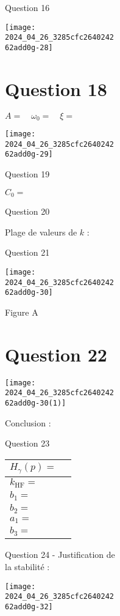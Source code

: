 {\begin{figure}[!h]
{\begin{figure}[!h]
{\begin{figure}[!h]
{\begin{figure}[!h]
{Question 16

\begin{center}
\texttt{[image: 2024\_04\_26\_3285cfc264024262add0g-28]}
\end{center}

\section*{Question 18}
$A=\quad \omega_{0}=\quad \xi=$

\begin{center}
\texttt{[image: 2024\_04\_26\_3285cfc264024262add0g-29]}
\end{center}

Question 19

$C_{0}=$

Question 20

Plage de valeurs de $k$ :

Question 21

\begin{center}
\texttt{[image: 2024\_04\_26\_3285cfc264024262add0g-30]}
\end{center}

Figure A

\section*{Question 22}
\begin{center}
\texttt{[image: 2024\_04\_26\_3285cfc264024262add0g-30(1)]}
\end{center}

Conclusion :

Question 23

\begin{center}
\begin{tabular}{|l|l|}
\hline
$H_{\gamma}(p)=$ \\
\hline
$k_{\mathrm{HF}}=$ \\
\hline
$b_{1}=$ \\
\hline
$b_{2}=$ \\
\hline
$a_{1}=$ \\
\hline
$b_{3}=$ \\
\hline
\end{tabular}
\end{center}

Question 24 - Justification de la stabilité :

\begin{center}
\texttt{[image: 2024\_04\_26\_3285cfc264024262add0g-32]}
\end{center}

}
\end{figure}}
\end{figure}}
\end{figure}}
\end{figure}}
